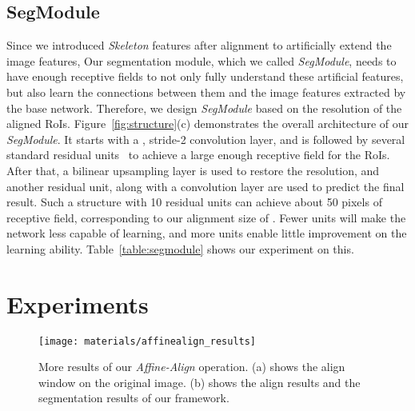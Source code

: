 \documentclass[10pt,twocolumn,letterpaper]{article}
\begin{document}
\subsection {SegModule}
\label{method:seg}
Since we introduced \emph{Skeleton} features after alignment to artificially extend the image features,  Our segmentation module, which we called \emph{SegModule}, needs to have enough receptive fields to not only fully understand these artificial features, but also learn the connections between them and the image features extracted by the base network. Therefore, we design \emph{SegModule} based on the resolution of the aligned RoIs. Figure~\ref{fig:structure}(c) demonstrates the overall architecture of our \emph{SegModule}. It starts with a , stride-2 convolution layer, and is followed by several standard residual units~\cite{he2016deep} to achieve
a large enough receptive field for the RoIs.
After that, a bilinear upsampling layer is used to restore the resolution, and another residual unit, along with a  convolution layer are used to predict the final result. 
Such a structure with 10 residual units can achieve about 50 pixels of receptive field, corresponding to our alignment size of . Fewer units will make the network less capable of learning, and more units enable little improvement on the learning ability. Table~\ref{table:segmodule} shows our experiment on this.



 

\section{Experiments}

\begin{figure*}[t]
\centering
\setlength{\abovecaptionskip}{0.1cm}
\setlength{\belowcaptionskip}{-0.3cm}
\texttt{[image: materials/affinealign\_results]}
\caption{More results of our \emph{Affine-Align} operation. (a) shows the align window on the original image. (b) shows the align results  and the segmentation results of our framework.}
\label{fig:affinealign_results}
\end{figure*}
\end{document}
